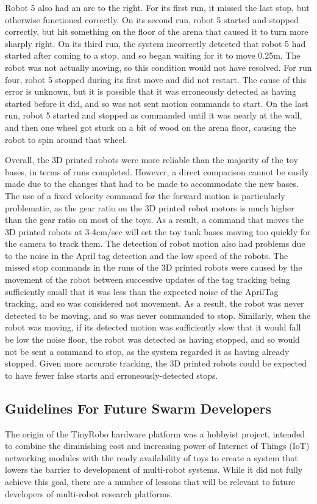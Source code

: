 Robot 5 also had an arc to the right. For its first run, it missed the last stop, but otherwise functioned correctly. 
On its second run, robot 5 started and stopped correctly, but hit something on the floor of the arena that caused it to turn more sharply right. 
On its third run, the system incorrectly detected that robot 5 had started after coming to a stop, and so began waiting for it to move 0.25m. 
The robot was not actually moving, so this condition would not have resolved. 
For run four, robot 5 stopped during its first move and did not restart.
The cause of this error is unknown, but it is possible that it was erroneously detected as having started before it did, and so was not sent motion commands to start. 
On the last run, robot 5 started and stopped as commanded until it was nearly at the wall, and then one wheel got stuck on a bit of wood on the arena floor, causing the robot to spin around that wheel. 

Overall, the 3D printed robots were more reliable than the majority of the toy bases, in terms of runs completed. 
However, a direct comparison cannot be easily made due to the changes that had to be made to accommodate the new bases. 
The use of a fixed velocity command for the forward motion is particularly problematic, as the gear ratio on the 3D printed robot motors is much higher than the gear ratio on most of the toys. 
As a result, a command that moves the 3D printed robots at 3-4cm/sec will set the toy tank bases moving too quickly for the camera to track them. 
The detection of robot motion also had problems due to the noise in the April tag detection and the low speed of the robots. 
The missed stop commands in the runs of the 3D printed robots were caused by the movement of the robot between successive updates of the tag tracking being sufficiently small that it was less than the expected noise of the AprilTag tracking, and so was considered not movement. 
As a result, the robot was never detected to be moving, and so was never commanded to stop. 
Similarly, when the robot was moving, if its detected motion was sufficiently slow that it would fall be low the noise floor, the robot was detected as having stopped, and so would not be sent a command to stop, as the system regarded it as having already stopped. 
Given more accurate tracking, the 3D printed robots could be expected to have fewer false starts and erroneously-detected stops.  

\subsection{Guidelines For Future Swarm Developers}
The origin of the TinyRobo hardware platform was a hobbyist project, intended to combine the diminishing cost and increasing power of Internet of Things (IoT) networking modules with the ready availability of toys to create a system that lowers the barrier to development of multi-robot systems.
While it did not fully achieve this goal, there are a number of lessons that will be relevant to future developers of multi-robot research platforms. 

